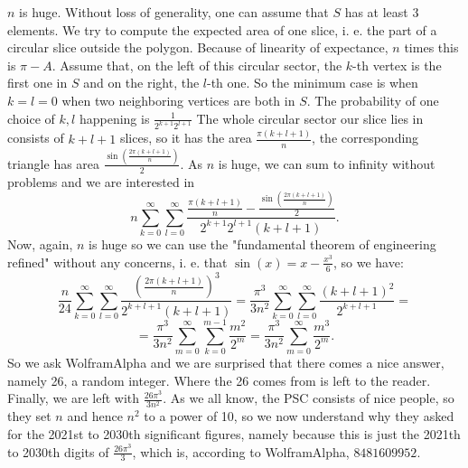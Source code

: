 \begin{solution}\hfil\medskip
  
    $n$ is huge. Without loss of generality, one can assume that $S$ has at least 3 elements. We try to compute the expected area of one slice, i. e. 
    the part of a circular slice outside the polygon. Because of linearity of expectance, $n$ times this is $\pi-A$. Assume that, on the left of this circular 
    sector, the $k$-th vertex is the first one in $S$ and on the right, the $l$-th one. So the minimum case is when $k=l=0$ when two neighboring vertices are 
    both in $S$. The probability of one choice of $k,l$ happening is $\frac{1}{2^{k+1}2^{l+1}}$ The whole circular sector our slice lies in consists of 
    $k+l+1$ slices, so it has the area $\frac{\pi(k+l+1)}{n}$, the corresponding triangle has area $\frac{\sin(\frac{2\pi(k+l+1)}{n})}{2}$. As $n$ is huge, 
    we can sum to infinity without problems and  we are interested in $$n\sum_{k=0}^\infty \sum_{l=0}^\infty\frac{\frac{\pi(k+l+1)}{n}-\frac{\sin(\frac{2\pi(k+l+1)}{n})}{2}}{2^{k+1}2^{l+1}(k+l+1)}.$$ 
    Now, again, $n$ is huge so we can use the "fundamental theorem of engineering refined" without any concerns, i. e. that $\sin(x)=x-\frac{x^3}{6}$, 
    so we have: $$\frac{n}{24}\sum_{k=0}^\infty \sum_{l=0}^\infty \frac{\left(\frac{2\pi(k+l+1)}{n}\right)^3}{2^{k+l+1}(k+l+1)}=\frac{\pi^3}{3n^2}\sum_{k=0}^\infty \sum_{l=0}^\infty\frac{(k+l+1)^2}{2^{k+l+1}}=$$
    $$=\frac{\pi^3}{3n^2}\sum_{m=0}^\infty \sum_{k=0}^{m-1}\frac{m^2}{2^m}=\frac{\pi^3}{3n^2}\sum_{m=0}^\infty\frac{m^3}{2^m}.$$ So we ask WolframAlpha and we are surprised that there comes a nice answer, namely 26, a random integer. Where the 26 comes from is left to the reader. Finally, we are left with $\frac{26\pi^3}{3n^2}$. As we all know, the PSC consists of nice people, so they set $n$ and hence $n^2$ to a power of 10, so we now understand why they asked for the 2021st to 2030th significant figures, namely because this is just the 2021th to 2030th digits of $\frac{26\pi^3}{3}$, which is, according to WolframAlpha, $\boxed{8481609952}.$
\end{solution}\bigskip